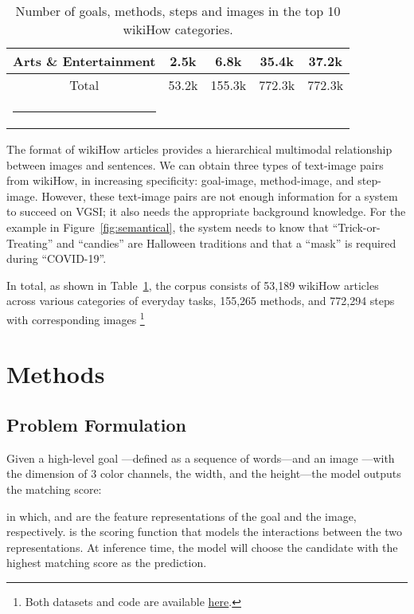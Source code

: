 \documentclass[11pt]{article}
\makeatletter
\newcommand{\thickhline}{\noalign {\ifnum 0=`}\fi \hrule height 1pt
    \futurelet \reserved@a \@xhline
}
\makeatother
\begin{document}
\begin{table}[!t]
{\begin{tabular}{ccccc}
Arts \& Entertainment                                                  & 2.5k                      & 6.8k                       & 35.4k                      & 37.2k                      \\ \hline
Total                                                                  & \multicolumn{1}{l}{53.2k} & \multicolumn{1}{l}{155.3k} & \multicolumn{1}{l}{772.3k} & \multicolumn{1}{l}{772.3k} \\ \thickhline
\end{tabular}
}
\captionsetup{justification=centering}
\caption{Number of goals, methods, steps and images in the top 10 wikiHow categories.}\vspace{-0.5cm}
\label{category}
\end{table}

The format of wikiHow articles provides a hierarchical multimodal relationship between images and sentences. We can obtain three types of text-image pairs from wikiHow, in increasing specificity: goal-image, method-image, and step-image. However, these text-image pairs are not enough information for a system to succeed on VGSI; it also needs the appropriate background knowledge. For the example in Figure~\ref{fig:semantical}, the system needs to know that ``Trick-or-Treating'' and ``candies'' are Halloween traditions and that a ``mask'' is required during ``COVID-19''.

In total, as shown in Table~\ref{category}, the corpus consists of 53,189 wikiHow articles across various categories of everyday tasks, 155,265 methods, and 772,294 steps with corresponding images \footnote{Both datasets and code are available \href{https://github.com/YueYANG1996/wikiHow-VGSI}{here}.}

\section{Methods}
\subsection{Problem Formulation}
Given a high-level goal ---defined as a sequence of words---and an image ---with the dimension of 3 color channels, the width, and the height---the model outputs the matching score:

in which,  and  are the feature representations of the goal and the image, respectively.  is the scoring function that models the interactions between the two representations. At inference time, the model will choose the candidate with the highest matching score as the prediction.
\end{document}
